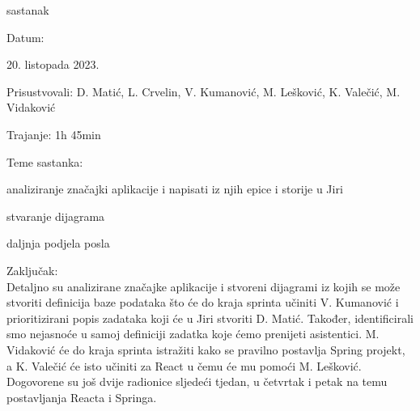 \begin{packed_enum}
   
			\item  sastanak
			\item[] \begin{packed_item}
				\item Datum: \date[{20. listopada 2023.}
				\item Prisustvovali:  D. Matić, L. Crvelin, V. Kumanović, M. Lešković, K. Valečić, M. Vidaković
				\item Trajanje: 1h 45min
				\item Teme sastanka:
				\begin{packed_item}
					\item  analiziranje značajki aplikacije i napisati iz njih epice i storije u Jiri
					\item  stvaranje dijagrama
                    \item  daljnja podjela posla
				\end{packed_item}
            \item Zaključak: \\Detaljno su analizirane značajke aplikacije i stvoreni dijagrami iz kojih se može stvoriti definicija baze podataka što će do kraja sprinta učiniti V. Kumanović i prioritizirani popis zadataka koji će u Jiri stvoriti D. Matić. Također, identificirali smo nejasnoće u samoj definiciji zadatka koje ćemo prenijeti asistentici.
            M. Vidaković će do kraja sprinta istražiti kako se pravilno postavlja Spring projekt, a K. Valečić će isto učiniti za React u čemu će mu pomoći M. Lešković. \\
            Dogovorene su još dvije radionice sljedeći tjedan, u četvrtak i petak na temu postavljanja Reacta i Springa.
			\end{packed_item}



\end{packed_enum}
